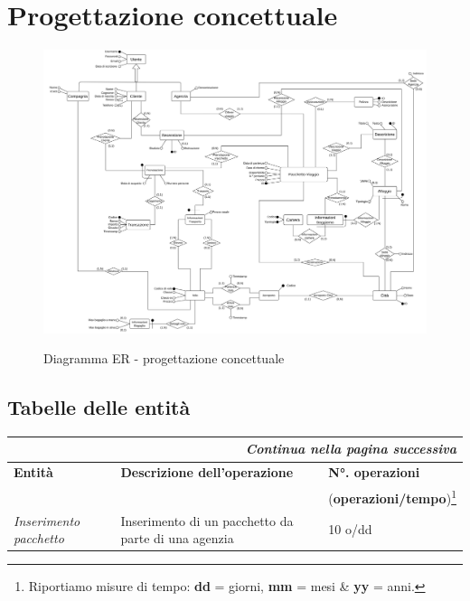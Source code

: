 \section{Progettazione concettuale}

\begin{figure}
    \centering
    \caption{Diagramma ER - progettazione concettuale}
    \includegraphics[width=\textwidth]{assets/ER_concettuale.png}
    \label{fig:er_concettuale}
\end{figure}

\subsection{Tabelle delle entità}
\begin{center}
    \begin{tabularx}{\textwidth}{p{} X p{}}
        \caption{Tabella delle entità}\\\toprule\endfirsthead
        \toprule\endhead
        \midrule\multicolumn{3}{r}{\itshape Continua nella pagina successiva}\\\midrule\endfoot
        \bottomrule\endlastfoot
        \textbf{Entità} & \textbf{Descrizione dell'operazione} & \textbf{N°. operazioni}
        \\
        && (\textbf{operazioni/tempo})\footnote{Riportiamo misure di tempo: \textbf{dd} = giorni, \textbf{mm} = mesi \& \textbf{yy} = anni.}
        \\\midrule
        \emph{Inserimento pacchetto} & Inserimento di un pacchetto da parte di una agenzia & 10 o/dd
        \\
    \end{tabularx}
\end{center}

